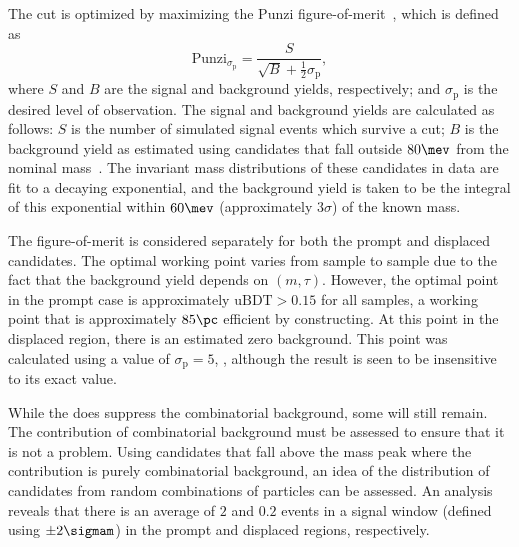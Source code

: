 
%

The \uBDT cut is optimized  by maximizing
the Punzi figure-of-merit~\cite{2003sppp.conf...79P}, which is defined as
\begin{equation}
  \mathrm{Punzi}_{\sigma_\mathrm{p}} = \frac{S}{\sqrt{B} + \tfrac12\sigma_\mathrm{p}},
  \label{eq:db:punzi}
\end{equation}
where $S$ and $B$ are the signal and background yields, respectively; and $\sigma_\mathrm{p}$ is the desired
level of observation.
The signal and background yields are calculated as follows:
$S$ is the number of simulated signal events which survive a \uBDT cut;
$B$ is the background yield as estimated using \btokstrdb candidates
that fall outside $80\mev$ from the nominal \Bd mass~\cite{PDG2014}.
The invariant mass distributions of these candidates in data are fit to a decaying exponential,
and the background yield is taken to be the integral of this exponential within $60\mev$
(approximately $3\sigma$) of the known \Bd mass.

The figure-of-merit is considered separately for both the prompt and displaced candidates.
The optimal working point varies from sample to sample due to the fact that the background yield
depends on $(m,\tau)$.
However, the optimal point in the prompt case is approximately $\mathrm{uBDT}>0.15$ for all samples, a
working point that
is approximately $85\pc$ efficient by constructing.
At this point in the displaced region, there is an estimated zero background.
This point was calculated using a value of $\sigma_\mathrm{p}=5$, , although the
result is seen to be insensitive to its exact value.

While the \uBDT does suppress the combinatorial background, some will still remain.
The contribution of combinatorial background must be assessed to ensure that it is not a problem.
Using \Bd candidates that fall above the \Bd mass peak where the contribution is purely
combinatorial background, an idea of the distribution of \db candidates from random combinations of
particles can be assessed.
An analysis reveals that there is an average of \approx$2$ and \approx$0.2$ events in a signal
window (defined using $\pm2\sigmam$) in the prompt and displaced regions, respectively.


